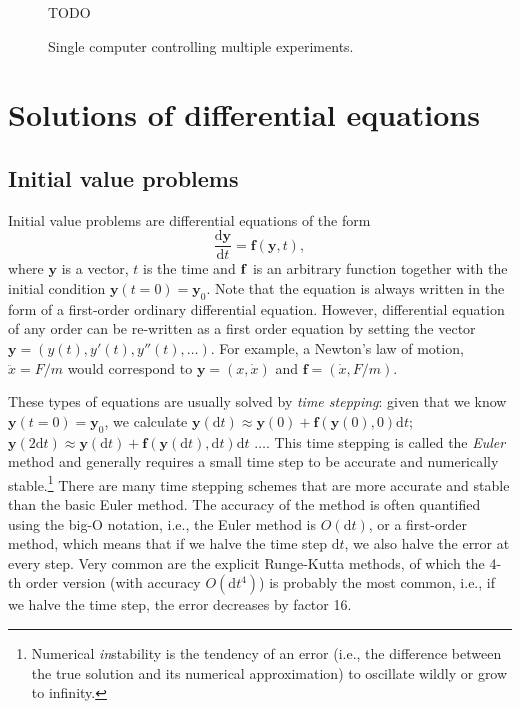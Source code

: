 \documentclass{article}
\newcommand{\dd}{\ensuremath{\mathrm{d}}}
\newcommand{\diff}[2]{\ensuremath{\frac{\dd {#1}}{\dd {#2}}}}
\newcommand{\bv}[1]{\ensuremath{\mathbf{#1}}}
\begin{document}
\begin{figure}
    \label{fig:networking-usecase}
    TODO
    \caption{Single computer controlling multiple experiments.}
\end{figure}

\newpage
\section{Solutions of differential equations}
\subsection{Initial value problems}
Initial value problems are differential equations of the form
\begin{equation}
    \label{eq:ivp}
    \diff{\bv y}{t} = \bv f(\bv y, t),
\end{equation}
where $\bv y$ is a vector, $t$ is the time and $\bf f$ is an arbitrary function together with the initial condition $\bv y(t=0) = \bv y_0$. Note that the equation is always written in the form of a first-order ordinary differential equation. However, differential equation of any order can be re-written as a first order equation by setting the vector $\bv y = (y(t), y'(t), y''(t), \dots)$. For example, a Newton's law of motion, $\ddot x = F/m$ would correspond to $\bv y = (x, \dot x)$ and $\bv f = (\dot x, F/m)$.

These types of equations are usually solved by \emph{time stepping}: given that we know $\bv y(t=0) = \bv y_0$, we calculate $\bv y(\dd t) \approx \bv y(0) + \bv f(\bv y(0), 0)\dd t$; $\bv y(2\dd t) \approx \bv y(\dd t) + \bv f(\bv y(\dd t), \dd t)\dd t$ $\dots$. This time stepping is called the \emph{Euler} method and generally requires a small time step to be accurate and numerically stable.\footnote{Numerical \emph{in}stability is the tendency of an error (i.e., the difference between the true solution and its numerical approximation) to oscillate wildly or grow to infinity.} There are many time stepping schemes that are more accurate and stable than the basic Euler method. The accuracy of the method is often quantified using the big-O notation, i.e., the Euler method is $O(\dd t)$, or a first-order method, which means that if we halve the time step $\dd t$, we also halve the error at every step. Very common are the explicit Runge-Kutta methods, of which the 4-th order version (with accuracy $O(\dd t^4)$) is probably the most common, i.e., if we halve the time step, the error decreases by factor 16.
\end{document}
